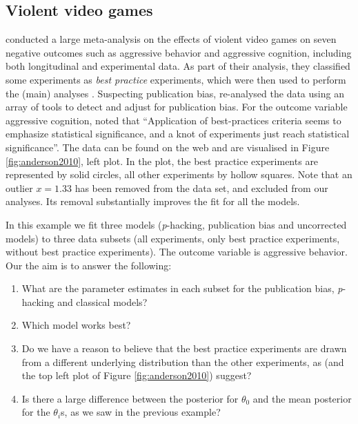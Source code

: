 \documentclass[preprint, authoryear]{elsarticle}
\theoremstyle{plain}
\theoremstyle{definition}
\begin{document}
\subsection{Violent video games\label{subsec:Anderson}}

\citet{anderson2010violent} conducted a large meta-analysis on the effects of violent video games on seven negative outcomes such as aggressive behavior and aggressive cognition, including both longitudinal and experimental data. As part of their analysis, they classified some experiments as \emph{best practice} experiments, which were then used to perform the (main) analyses \citep[for more details, see Table 2 of][]{anderson2010violent}. Suspecting publication bias, \citet{hilgard2017overstated} re-analysed the data using an array of tools to detect and adjust for publication bias. For the outcome variable aggressive cognition, \citet{hilgard2017overstated} noted that ``Application of best-practices criteria seems to emphasize statistical significance, and a knot of experiments just reach statistical significance''. The data can be found on the web \citep{Hilgard2017} and are visualised in Figure \ref{fig:anderson2010}, left plot. In the plot, the best practice experiments are represented by solid circles, all other experiments by hollow squares. Note that an outlier $x=1.33$ has been removed from the data set, and excluded from our analyses. Its removal substantially improves the fit for all the models. 

In this example we fit three models (\emph{p}-hacking, publication bias and uncorrected models) to three data subsets (all experiments, only best practice experiments, without best practice experiments). The outcome variable is aggressive behavior. Our the aim is to answer the following:
\begin{enumerate}
\item What are the parameter estimates in each subset for the publication bias, \emph{p}-hacking and classical models?
\item Which model works best?
\item Do we have a reason to believe that the best practice experiments are drawn from a different underlying distribution than the other experiments, as \citet{hilgard2017overstated} (and the top left plot of Figure \ref{fig:anderson2010}) suggest?
\item Is there a large difference between the posterior for $\theta_{0}$ and the mean posterior for the $\theta_{i}$s, as we saw in the previous example?
\end{enumerate}
\end{document}
